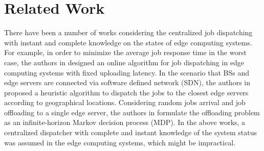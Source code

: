 \section{Related Work}
\label{sec:review}

There have been a number of works considering the centralized job dispatching with instant and complete knowledge on the states of edge computing systems.
For example, in order to minimize the average job response time in the worst case, the authors in \cite{tan-online} designed an online algorithm for job dispatching in edge computing systems with fixed uploading latency.
In the scenario that BSs and edge servers are connected via software defined network (SDN), the authors in \cite{IOTJ18-FanQ} proposed a heuristic algorithm to dispatch the jobs to the closest edge servers according to geographical locations.
Considering random jobs arrival and job offloading to a single edge server, the authors in \cite{mdp-globecom,mdp-tvt} formulate the offloading problem as an infinite-horizon Markov decision process (MDP).
In the above works, a centralized dispatcher with complete and instant knowledge of the system status was assumed in the edge computing systems, which might be impractical.

